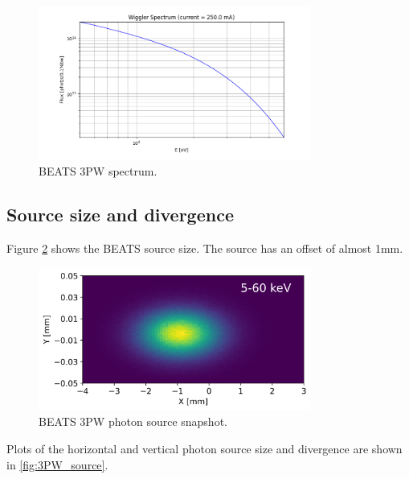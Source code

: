 \begin{figure}[ht]
\centering
\includegraphics[width=0.8\textwidth]{./../../beam_snapshots/3PW/wiggler_spectrum.png}
\caption{\label{fig:flux} BEATS 3PW spectrum.}
\end{figure}

\subsection{Source size and divergence}
Figure \ref{fig:snapshot_3PW} shows the BEATS source size. The source has an offset of almost 1mm. \\

\begin{figure}[ht]
\centering
\includegraphics[width=0.8\textwidth]{./../../beam_snapshots/3PW/source_snapshot_5-60keV.png}
\caption{\label{fig:snapshot_3PW} BEATS 3PW photon source snapshot.}
\end{figure}

Plots of the horizontal and vertical photon source size and divergence are shown in \ref{fig:3PW_source}.\\

